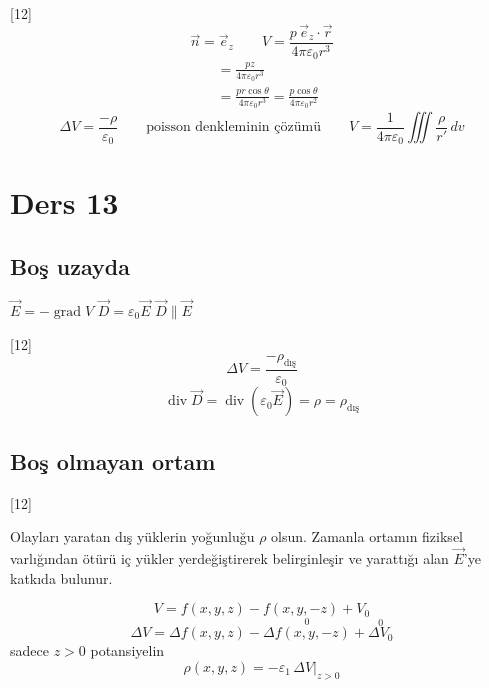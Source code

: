 \documentclass[11pt,a4paper]{article}
\begin{document}
[12]
\[
\vec n=\vec e_z\qquad V=\frac{p\,\vec e_z\cdot\vec r}{4\pi\varepsilon_0 r^{3}}
\]
\begin{align*}
&=\frac{pz}{4\pi\varepsilon_0 r^{3}}\\
&=\frac{pr\cos\theta}{4\pi\varepsilon_0 r^{3}}=\frac{p\cos\theta}{4\pi\varepsilon_0 r^{2}}
\end{align*}
\[
\Delta V=\frac{-\rho}{\varepsilon_0}\qquad\text{poisson denkleminin çözümü}\qquad V=\frac{1}{4\pi\varepsilon_0}\iiint\frac{\rho}{r'}\,dv
\]

\section{Ders 13}
\subsection{Boş uzayda}
$\vec E=-\operatorname{grad}V$ \quad $\vec D=\varepsilon_0\vec E$ \quad $\vec D\parallel\vec E$

[12]
\[
\Delta V=\frac{-\rho_{\text{dış}}}{\varepsilon_0}
\]
\[
\operatorname{div}\vec D=\operatorname{div}(\varepsilon_0\vec E)=\rho=\rho_{\text{dış}}
\]

\subsection{Boş olmayan ortam}
[12]

Olayları yaratan dış yüklerin yoğunluğu $\rho$ olsun. Zamanla ortamın fiziksel varlığından ötürü iç yükler yerdeğiştirerek belirginleşir ve yarattığı alan $\vec E$'ye katkıda bulunur.


\[
V=f(x,y,z)-f(x,y,-z)+V_0
\]
\[
\Delta V=\Delta f(x,y,z)-\overset{0}{\Delta f(x,y,-z)}+\overset{0}{\Delta V_0}
\]
sadece $z>0$ potansiyelin 
\[
\rho(x,y,z)=-\varepsilon_1\,\Delta V\big|_{z>0}
\]
\end{document}
